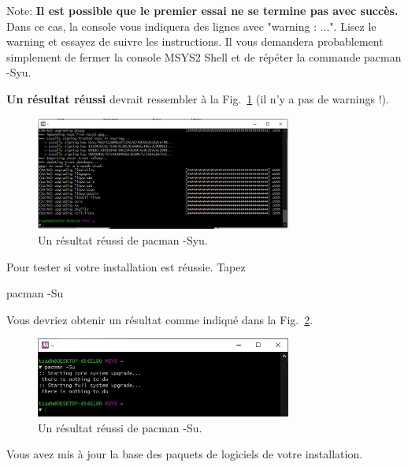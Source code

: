 \documentclass{article}
\newcommand\fig[1]{{Fig.~\ref{#1}}}
\begin{document}
Note: \textbf{Il est possible que le premier essai ne se termine pas avec succès.} Dans ce cas, la console vous indiquera des lignes avec "warning : ...". Lisez le warning et essayez de suivre les instructions. Il vous demandera probablement simplement de fermer la console MSYS2 Shell et de répéter la commande pacman -Syu.

\textbf{Un résultat réussi} devrait ressembler à la \fig{F:Syu} (il n'y a pas de warnings !).
\begin{figure}[H]
\center
\includegraphics[width=0.75\textwidth]{Plots/Msys2_9Terminal.jpeg}
\caption{Un résultat réussi de pacman -Syu.\label{F:Syu}}
\end{figure}
Pour tester si votre installation est réussie. Tapez
\begin{tcolorbox}[width=\textwidth,colframe=Purple,colback={black},title={Ceci est la console MSYS2 Shell},outer arc=0mm,colupper=white]    
      pacman -Su
\end{tcolorbox}
Vous devriez obtenir un résultat comme indiqué dans la \fig{F:Su}.
\begin{figure}[H]
\center
\includegraphics[width=0.75\textwidth]{Plots/Msys2_9b.jpeg}
\caption{Un résultat réussi de pacman -Su.\label{F:Su}}
\end{figure}
Vous avez mis à jour la base des paquets de logiciels de votre installation.
\end{document}
